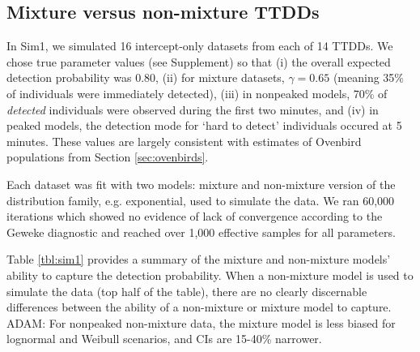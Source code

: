 \documentclass[useAMS,usenatbib,referee,12pt]{article}
\newcommand{\adam}[1]{{\color{blue} ADAM: #1}}
\begin{document}
\subsection{Mixture versus non-mixture TTDDs}\label{sec:mixture}

In Sim1, we simulated 16 intercept-only datasets from each of 14 TTDDs. 
We chose true parameter values (see Supplement) so that (i) the overall expected detection probability was 0.80, (ii) for mixture datasets, $\gamma = 0.65$ (meaning 35\% of individuals were immediately detected), (iii) in nonpeaked models, 70\% of \textit{detected} individuals were observed during the first two minutes, and (iv) in peaked models, the detection mode for `hard to detect' individuals occured at 5 minutes.
These values are largely consistent with estimates of Ovenbird populations from Section \ref{sec:ovenbirds}.

Each dataset was fit with two models: mixture and non-mixture version of the distribution family, e.g. exponential, used to simulate the data.
We ran 60,000 iterations which showed no evidence of lack of convergence according to the Geweke diagnostic and reached over 1,000 effective samples for all parameters.

Table \ref{tbl:sim1} provides a summary of the mixture and non-mixture models' ability to capture the detection probability. 
When a non-mixture model is used to simulate the data (top half of the table), there are no clearly discernable differences between the ability of a non-mixture or mixture model to capture.  \adam{For nonpeaked non-mixture data, the mixture model is less biased for lognormal and Weibull scenarios, and CIs are 15-40\% narrower.}
\end{document}

